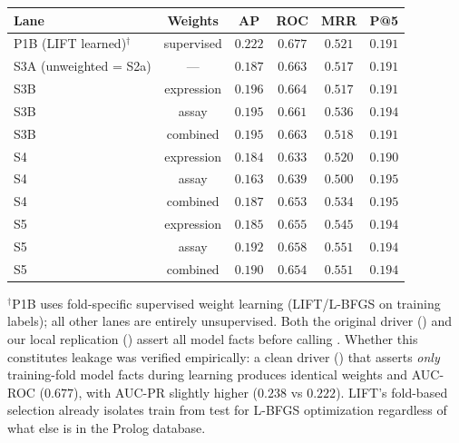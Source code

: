 \documentclass[11pt,openany]{report}
\begin{document}
\begin{center}
\small
\begin{tabular}{@{}lccccc@{}}
\toprule
\textbf{Lane} & \textbf{Weights} & \textbf{AP} & \textbf{ROC}
  & \textbf{MRR} & \textbf{P@5} \\
\midrule
P1B (LIFT learned)$^\dagger$ & supervised & $0.222$ & $0.677$ & $0.521$ & $0.191$ \\
\midrule
S3A (unweighted = S2a) & --- & $0.187$ & $0.663$ & $0.517$ & $0.191$ \\
S3B & expression & $0.196$ & $0.664$ & $0.517$ & $0.191$ \\
S3B & assay & $0.195$ & $0.661$ & $0.536$ & $0.194$ \\
S3B & combined & $0.195$ & $0.663$ & $0.518$ & $0.191$ \\
S4  & expression & $0.184$ & $0.633$ & $0.520$ & $0.190$ \\
S4  & assay & $0.163$ & $0.639$ & $0.500$ & $0.195$ \\
S4  & combined & $0.187$ & $0.653$ & $0.534$ & $0.195$ \\
S5  & expression & $0.185$ & $0.655$ & $0.545$ & $0.194$ \\
S5  & assay & $0.192$ & $0.658$ & $0.551$ & $0.194$ \\
S5  & combined & $0.190$ & $0.654$ & $0.551$ & $0.194$ \\
\bottomrule
\end{tabular}
\end{center}
\noindent
{\footnotesize $^\dagger$P1B uses fold-specific supervised weight learning
(LIFT/L-BFGS on training labels); all other lanes are entirely unsupervised.
Both the original driver () and our local
replication () assert all
model facts before calling .  Whether this
constitutes leakage was verified empirically: a clean driver
() that asserts \emph{only}
training-fold model facts during learning produces identical weights
and AUC-ROC ($0.677$), with AUC-PR slightly higher ($0.238$ vs $0.222$).
LIFT's fold-based selection already isolates train from test for L-BFGS
optimization regardless of what else is in the Prolog database.}
\end{document}
